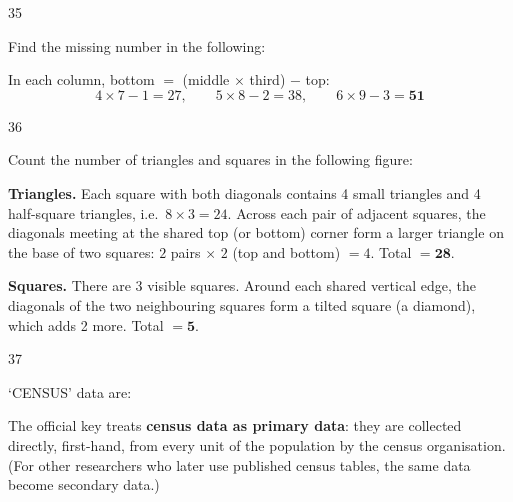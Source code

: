 \begin{question}{35}
{Find the missing number in the following:\par}
\begin{explain}
In each column, bottom $=$ (middle $\times$ third) $-$ top:
\[4\times7-1=27,\qquad 5\times8-2=38,\qquad 6\times9-3=\mathbf{51}\]
\end{explain}
\end{question}

\begin{question}{36}
{Count the number of triangles and squares in the following figure:\par}
\begin{explain}
\textbf{Triangles.} Each square with both diagonals contains 4 small triangles and 4 half-square triangles, i.e.\ $8\times3=24$. Across each pair of adjacent squares, the diagonals meeting at the shared top (or bottom) corner form a larger triangle on the base of two squares: $2$ pairs $\times$ $2$ (top and bottom) $=4$. Total $=\mathbf{28}$.

\textbf{Squares.} There are 3 visible squares. Around each shared vertical edge, the diagonals of the two neighbouring squares form a tilted square (a diamond), which adds 2 more. Total $=\mathbf{5}$.
\end{explain}
\end{question}

\begin{question}{37}
{`CENSUS' data are:\par}
\begin{explain}
The official key treats \textbf{census data as primary data}: they are collected directly, first-hand, from every unit of the population by the census organisation. (For other researchers who later use published census tables, the same data become secondary data.)
\end{explain}
\end{question}

